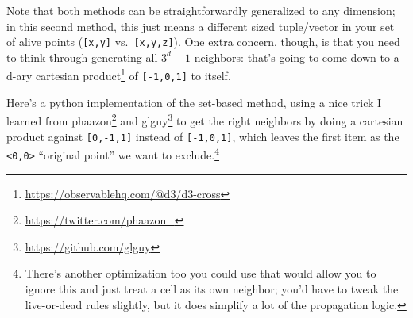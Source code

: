 \documentclass[]{article}
\renewcommand{\href}[2]{#2\footnote{\url{#1}}}
\begin{document}
Note that both methods can be straightforwardly generalized to any dimension; in
this second method, this just means a different sized tuple/vector in your set
of alive points (\texttt{{[}x,y{]}} vs.~\texttt{{[}x,y,z{]}}). One extra
concern, though, is that you need to think through generating all \(3^d-1\)
neighbors: that's going to come down to a d-ary
\href{https://observablehq.com/@d3/d3-cross}{cartesian product} of
\texttt{{[}-1,0,1{]}} to itself.

Here's a python implementation of the set-based method, using a nice trick I
learned from \href{https://twitter.com/phaazon_}{phaazon} and
\href{https://github.com/glguy}{glguy} to get the right neighbors by doing a
cartesian product against \texttt{{[}0,-1,1{]}} instead of
\texttt{{[}-1,0,1{]}}, which leaves the first item as the
\texttt{\textless{}0,0\textgreater{}} ``original point'' we want to
exclude.\footnote{There's another optimization too you could use that would
  allow you to ignore this and just treat a cell as its own neighbor; you'd have
  to tweak the live-or-dead rules slightly, but it does simplify a lot of the
  propagation logic.}
\end{document}
